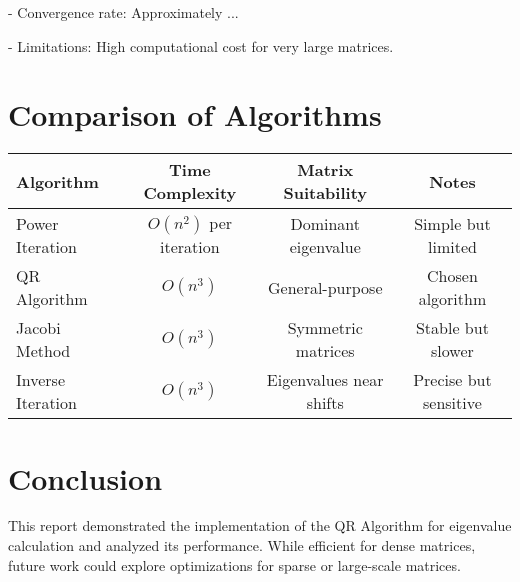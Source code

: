 \documentclass[journal]{IEEEtran}
\begin{document}
- Convergence rate: Approximately ...

- Limitations: High computational cost for very large matrices.

\section{Comparison of Algorithms}
\begin{tabular}{|l|c|c|c|}
\hline
Algorithm & Time Complexity & Matrix Suitability & Notes \\
\hline
Power Iteration & $O(n^2)$ per iteration & Dominant eigenvalue & Simple but limited \\
QR Algorithm & $O(n^3)$ & General-purpose & Chosen algorithm \\
Jacobi Method & $O(n^3)$ & Symmetric matrices & Stable but slower \\
Inverse Iteration & $O(n^3)$ & Eigenvalues near shifts & Precise but sensitive \\
\hline
\end{tabular}

\section{Conclusion}
This report demonstrated the implementation of the QR Algorithm for eigenvalue calculation and analyzed its performance. While efficient for dense matrices, future work could explore optimizations for sparse or large-scale matrices.





    
\end{document}
